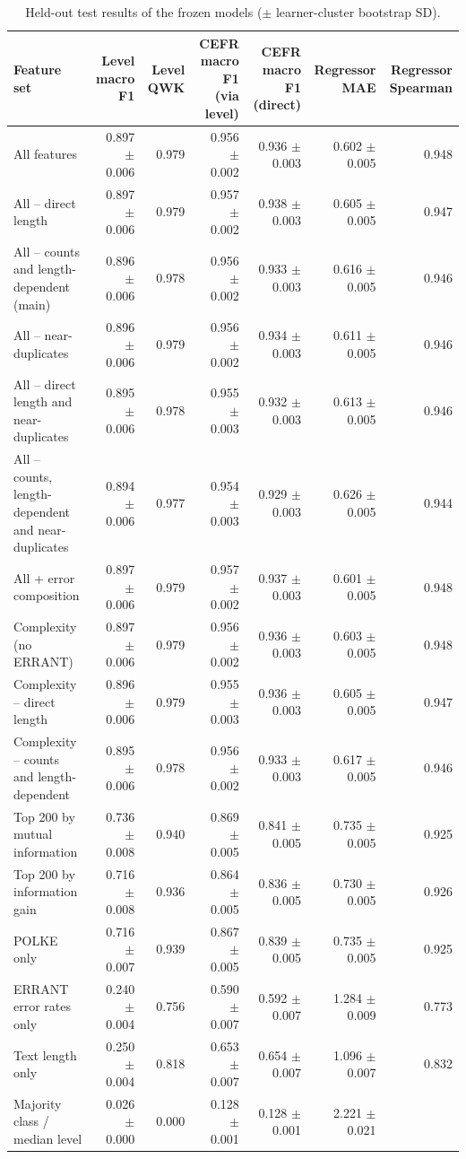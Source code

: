 \begin{table}[t]
\centering
\small
\begin{tabular}{lrrrrrr}
\toprule
Feature set & Level macro F1 & Level QWK & CEFR macro F1 (via level) & CEFR macro F1 (direct) & Regressor MAE & Regressor Spearman \\
\midrule
All features & 0.897 $\pm$ 0.006 & 0.979 & 0.956 $\pm$ 0.002 & 0.936 $\pm$ 0.003 & 0.602 $\pm$ 0.005 & 0.948 \\
All -- direct length & 0.897 $\pm$ 0.006 & 0.979 & 0.957 $\pm$ 0.002 & 0.938 $\pm$ 0.003 & 0.605 $\pm$ 0.005 & 0.947 \\
All -- counts and length-dependent (main) & 0.896 $\pm$ 0.006 & 0.978 & 0.956 $\pm$ 0.002 & 0.933 $\pm$ 0.003 & 0.616 $\pm$ 0.005 & 0.946 \\
All -- near-duplicates & 0.896 $\pm$ 0.006 & 0.979 & 0.956 $\pm$ 0.002 & 0.934 $\pm$ 0.003 & 0.611 $\pm$ 0.005 & 0.946 \\
All -- direct length and near-duplicates & 0.895 $\pm$ 0.006 & 0.978 & 0.955 $\pm$ 0.003 & 0.932 $\pm$ 0.003 & 0.613 $\pm$ 0.005 & 0.946 \\
All -- counts, length-dependent and near-duplicates & 0.894 $\pm$ 0.006 & 0.977 & 0.954 $\pm$ 0.003 & 0.929 $\pm$ 0.003 & 0.626 $\pm$ 0.005 & 0.944 \\
All + error composition & 0.897 $\pm$ 0.006 & 0.979 & 0.957 $\pm$ 0.002 & 0.937 $\pm$ 0.003 & 0.601 $\pm$ 0.005 & 0.948 \\
Complexity (no ERRANT) & 0.897 $\pm$ 0.006 & 0.979 & 0.956 $\pm$ 0.002 & 0.936 $\pm$ 0.003 & 0.603 $\pm$ 0.005 & 0.948 \\
Complexity -- direct length & 0.896 $\pm$ 0.006 & 0.979 & 0.955 $\pm$ 0.003 & 0.936 $\pm$ 0.003 & 0.605 $\pm$ 0.005 & 0.947 \\
Complexity -- counts and length-dependent & 0.895 $\pm$ 0.006 & 0.978 & 0.956 $\pm$ 0.002 & 0.933 $\pm$ 0.003 & 0.617 $\pm$ 0.005 & 0.946 \\
Top 200 by mutual information & 0.736 $\pm$ 0.008 & 0.940 & 0.869 $\pm$ 0.005 & 0.841 $\pm$ 0.005 & 0.735 $\pm$ 0.005 & 0.925 \\
Top 200 by information gain & 0.716 $\pm$ 0.008 & 0.936 & 0.864 $\pm$ 0.005 & 0.836 $\pm$ 0.005 & 0.730 $\pm$ 0.005 & 0.926 \\
POLKE only & 0.716 $\pm$ 0.007 & 0.939 & 0.867 $\pm$ 0.005 & 0.839 $\pm$ 0.005 & 0.735 $\pm$ 0.005 & 0.925 \\
ERRANT error rates only & 0.240 $\pm$ 0.004 & 0.756 & 0.590 $\pm$ 0.007 & 0.592 $\pm$ 0.007 & 1.284 $\pm$ 0.009 & 0.773 \\
Text length only & 0.250 $\pm$ 0.004 & 0.818 & 0.653 $\pm$ 0.007 & 0.654 $\pm$ 0.007 & 1.096 $\pm$ 0.007 & 0.832 \\
Majority class / median level & 0.026 $\pm$ 0.000 & 0.000 & 0.128 $\pm$ 0.001 & 0.128 $\pm$ 0.001 & 2.221 $\pm$ 0.021 &  \\
\bottomrule
\end{tabular}
\caption{Held-out test results of the frozen models ($\pm$ learner-cluster bootstrap SD).}
\label{tab:table_5_test_results}
\end{table}


